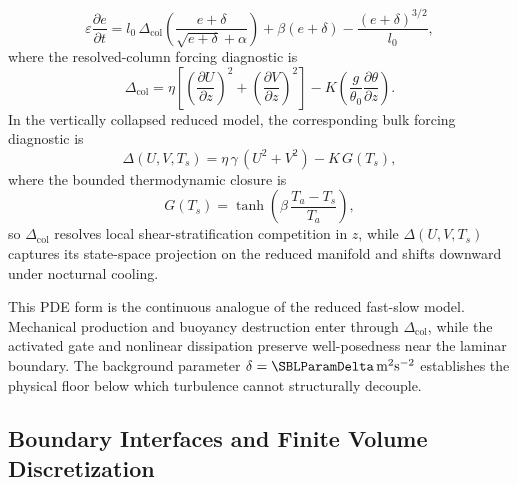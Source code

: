 \documentclass[11pt,letterpaper]{article}
\begin{document}
\begin{equation}
\varepsilon \frac{\partial e}{\partial t} = l_0\,\Delta_{\mathrm{col}}\left(\frac{e+\delta}{\sqrt{e+\delta}+\alpha}\right) + \beta(e+\delta) - \frac{(e+\delta)^{3/2}}{l_0},
\label{eq:gov_tke_continuous}
\end{equation}
where the resolved-column forcing diagnostic is
\begin{equation}
\Delta_{\mathrm{col}} = \eta\left[\left(\frac{\partial U}{\partial z}\right)^2 + \left(\frac{\partial V}{\partial z}\right)^2\right] - K\left(\frac{g}{\theta_0}\frac{\partial \theta}{\partial z}\right).
\end{equation}
In the vertically collapsed reduced model, the corresponding bulk forcing diagnostic is
\begin{equation}
\Delta(U,V,T_s)=\eta\,\gamma\,(U^2+V^2)-K\,G(T_s),
\end{equation}
where the bounded thermodynamic closure is
\begin{equation}
G(T_s)=\tanh\!\left(\beta\,\frac{T_a-T_s}{T_a}\right),
\end{equation}
so $\Delta_{\mathrm{col}}$ resolves local shear-stratification competition in $z$, while $\Delta(U,V,T_s)$ captures its state-space projection on the reduced manifold and shifts downward under nocturnal cooling.

This PDE form is the continuous analogue of the reduced fast-slow model. Mechanical production and buoyancy destruction enter through $\Delta_{\mathrm{col}}$, while the activated gate and nonlinear dissipation preserve well-posedness near the laminar boundary. The background parameter $\delta = \SBLParamDelta\,\mathrm{m}^2\mathrm{s}^{-2}$ establishes the physical floor below which turbulence cannot structurally decouple.

\subsection{Boundary Interfaces and Finite Volume Discretization}
\label{subsec:gov_boundary}
\end{document}
